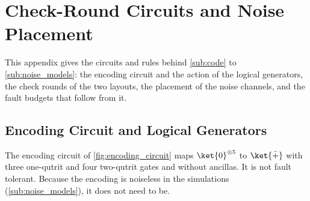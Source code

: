 \section{Check-Round Circuits and Noise Placement}
\label{app:rounds}

This appendix gives the circuits and rules behind \autoref{sub:code} to \autoref{sub:noise_models}: the encoding circuit and the action of the logical generators, the check rounds of the two layouts, the placement of the noise channels, and the fault budgets that follow from it.

\subsection{Encoding Circuit and Logical Generators}
\label{app:rounds-encoding}\label{app:rounds-conjugation}

The encoding circuit of \autoref{fig:encoding_circuit} maps $\ket{0}^{\otimes 5}$ to $\ket{\bar{+}}$ with three one-qutrit and four two-qutrit gates and without ancillas. It is not fault tolerant. Because the encoding is noiseless in the simulations (\autoref{sub:noise_models}), it does not need to be.

